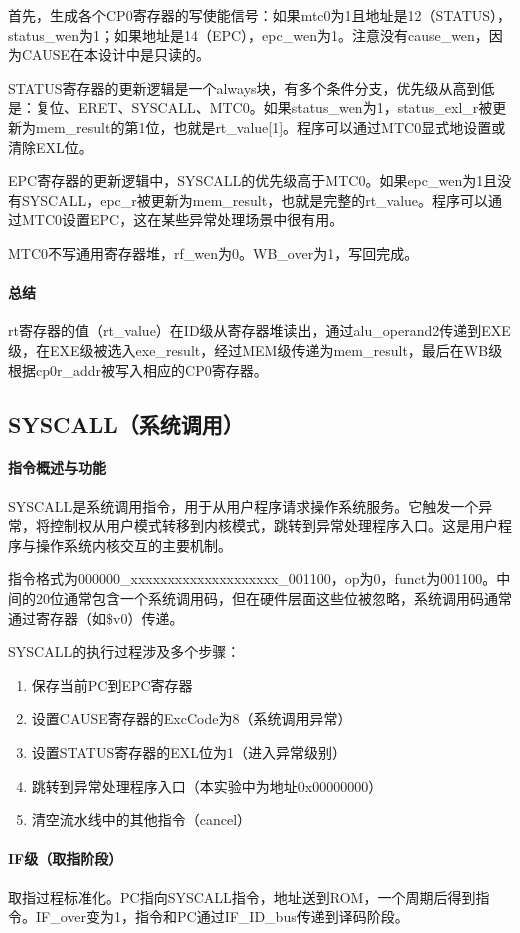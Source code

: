 \documentclass[a4paper]{article}
\begin{document}
	首先，生成各个CP0寄存器的写使能信号：如果mtc0为1且地址是12（STATUS），status\_wen为1；如果地址是14（EPC），epc\_wen为1。注意没有cause\_wen，因为CAUSE在本设计中是只读的。
	
	STATUS寄存器的更新逻辑是一个always块，有多个条件分支，优先级从高到低是：复位、ERET、SYSCALL、MTC0。如果status\_wen为1，status\_exl\_r被更新为mem\_result的第1位，也就是rt\_value[1]。程序可以通过MTC0显式地设置或清除EXL位。
	
	EPC寄存器的更新逻辑中，SYSCALL的优先级高于MTC0。如果epc\_wen为1且没有SYSCALL，epc\_r被更新为mem\_result，也就是完整的rt\_value。程序可以通过MTC0设置EPC，这在某些异常处理场景中很有用。
	
	MTC0不写通用寄存器堆，rf\_wen为0。WB\_over为1，写回完成。
	\paragraph{总结}
	rt寄存器的值（rt\_value）在ID级从寄存器堆读出，通过alu\_operand2传递到EXE级，在EXE级被选入exe\_result，经过MEM级传递为mem\_result，最后在WB级根据cp0r\_addr被写入相应的CP0寄存器。
	
	\subsection{SYSCALL（系统调用）}
	\paragraph{指令概述与功能}
	SYSCALL是系统调用指令，用于从用户程序请求操作系统服务。它触发一个异常，将控制权从用户模式转移到内核模式，跳转到异常处理程序入口。这是用户程序与操作系统内核交互的主要机制。
	
	指令格式为000000\_xxxxxxxxxxxxxxxxxxxx\_001100，op为0，funct为001100。中间的20位通常包含一个系统调用码，但在硬件层面这些位被忽略，系统调用码通常通过寄存器（如\$v0）传递。
	
	SYSCALL的执行过程涉及多个步骤：
	\begin{enumerate}
		\item 保存当前PC到EPC寄存器
		\item 设置CAUSE寄存器的ExcCode为8（系统调用异常）
		\item 设置STATUS寄存器的EXL位为1（进入异常级别）
		\item 跳转到异常处理程序入口（本实验中为地址0x00000000）
		\item 清空流水线中的其他指令（cancel）
	\end{enumerate}
	\paragraph{IF级（取指阶段）}
	取指过程标准化。PC指向SYSCALL指令，地址送到ROM，一个周期后得到指令。IF\_over变为1，指令和PC通过IF\_ID\_bus传递到译码阶段。
\end{document}
